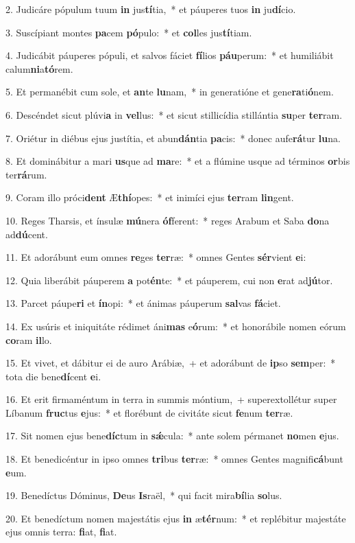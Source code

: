 ﻿2. Judicáre pópulum tuum \textbf{in} jus\textbf{tí}tia,~* et páuperes tuos \textbf{in} ju\textbf{dí}cio.

3. Suscípiant montes \textbf{pa}cem \textbf{pó}pulo:~* et \textbf{col}les jus\textbf{tí}tiam.

4. Judicábit páuperes pópuli, et salvos fáciet \textbf{fí}lios \textbf{páu}perum:~* et humiliábit calum\textbf{ni}a\textbf{tó}rem.

5. Et permanébit cum sole, et \textbf{an}te \textbf{lu}nam,~* in generatióne et gene\textbf{ra}ti\textbf{ó}nem.

6. Descéndet sicut plúvi\textbf{a} in \textbf{vel}lus:~* et sicut stillicídia stillántia \textbf{su}per \textbf{ter}ram.

7. Oriétur in diébus ejus justítia, et abun\textbf{dán}tia \textbf{pa}cis:~* donec aufe\textbf{rá}tur \textbf{lu}na.

8. Et dominábitur a mari \textbf{us}que ad \textbf{ma}re:~* et a flúmine usque ad términos \textbf{or}bis ter\textbf{rá}rum.

9. Coram illo próci\textbf{dent} Æ\textbf{thí}opes:~* et inimíci ejus \textbf{ter}ram \textbf{lin}gent.

10. Reges Tharsis, et ínsulæ \textbf{mú}nera \textbf{óf}ferent:~* reges Arabum et Saba \textbf{do}na ad\textbf{dú}cent.

11. Et adorábunt eum omnes \textbf{re}ges \textbf{ter}ræ:~* omnes Gentes \textbf{sér}vient \textbf{e}i:

12. Quia liberábit páuperem \textbf{a} pot\textbf{én}te:~* et páuperem, cui non \textbf{e}rat ad\textbf{jú}tor.

13. Parcet páupe\textbf{ri} et \textbf{ín}opi:~* et ánimas páuperum \textbf{sal}vas \textbf{fá}ciet.

14. Ex usúris et iniquitáte rédimet áni\textbf{mas} e\textbf{ó}rum:~* et honorábile nomen eórum \textbf{co}ram \textbf{il}lo.

15. Et vivet, et dábitur ei de auro Arábiæ,~+ et adorábunt de \textbf{ip}so \textbf{sem}per:~* tota die bene\textbf{dí}cent \textbf{e}i.

16. Et erit firmaméntum in terra in summis móntium,~+ superextollétur super Líbanum \textbf{fruc}tus \textbf{e}jus:~* et florébunt de civitáte sicut \textbf{fe}num \textbf{ter}ræ.

17. Sit nomen ejus bene\textbf{díc}tum in \textbf{sǽ}cula:~* ante solem pérmanet \textbf{no}men \textbf{e}jus.

18. Et benedicéntur in ipso omnes \textbf{tri}bus \textbf{ter}ræ:~* omnes Gentes magnifi\textbf{cá}bunt \textbf{e}um.

19. Benedíctus Dóminus, \textbf{De}us \textbf{Is}raël,~* qui facit mira\textbf{bí}lia \textbf{so}lus.

20. Et benedíctum nomen majestátis ejus \textbf{in} æ\textbf{tér}num:~* et replébitur majestáte ejus omnis terra: \textbf{fi}at, \textbf{fi}at.